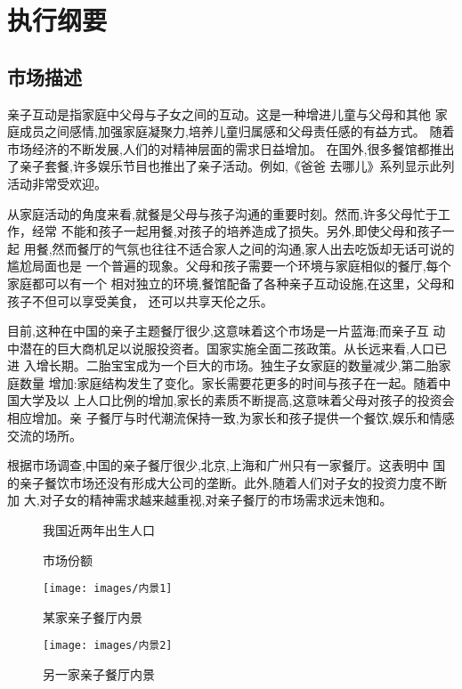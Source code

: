 \chapter{执行纲要}

\section{市场描述}
亲子互动是指家庭中父母与子女之间的互动。这是一种增进儿童与父母和其他
家庭成员之间感情,加强家庭凝聚力,培养儿童归属感和父母责任感的有益方式。
随着市场经济的不断发展,人们的对精神层面的需求日益增加。
在国外,很多餐馆都推出了亲子套餐,许多娱乐节目也推出了亲子活动。例如,《爸爸
去哪儿》系列显示此列活动非常受欢迎。

从家庭活动的角度来看,就餐是父母与孩子沟通的重要时刻。然而,许多父母忙于工作，经常
不能和孩子一起用餐,对孩子的培养造成了损失。另外,即使父母和孩子一起
用餐,然而餐厅的气氛也往往不适合家人之间的沟通,家人出去吃饭却无话可说的尴尬局面也是
一个普遍的现象。父母和孩子需要一个环境与家庭相似的餐厅,每个家庭都可以有一个
相对独立的环境,餐馆配备了各种亲子互动设施,在这里，父母和孩子不但可以享受美食，
还可以共享天伦之乐。

目前,这种在中国的亲子主题餐厅很少,这意味着这个市场是一片蓝海;而亲子互
动中潜在的巨大商机足以说服投资者。国家实施全面二孩政策。从长远来看,人口已进
入增长期。二胎宝宝成为一个巨大的市场。独生子女家庭的数量减少,第二胎家庭数量
增加:家庭结构发生了变化。家长需要花更多的时间与孩子在一起。随着中国大学及以
上人口比例的增加,家长的素质不断提高,这意味着父母对孩子的投资会相应增加。亲
子餐厅与时代潮流保持一致,为家长和孩子提供一个餐饮,娱乐和情感交流的场所。

根据市场调查,中国的亲子餐厅很少,北京,上海和广州只有一家餐厅。这表明中
国的亲子餐饮市场还没有形成大公司的垄断。此外,随着人们对子女的投资力度不断加
大,对子女的精神需求越来越重视,对亲子餐厅的市场需求远未饱和。

\begin{figure}[ htbp ]
        \centering
        \caption{我国近两年出生人口}
        
\end{figure}
\begin{figure}[ htbp ]
        \centering
        \caption{市场份额}
        \label{figure:market-share}
        
\end{figure}
\begin{figure}[ htbp ]
        \centering
        \caption{某家亲子餐厅内景}
        \texttt{[image: images/内景1]}
\end{figure}
\begin{figure}[ htbp ]
        \centering
        \caption{另一家亲子餐厅内景}
        \texttt{[image: images/内景2]}
\end{figure}


